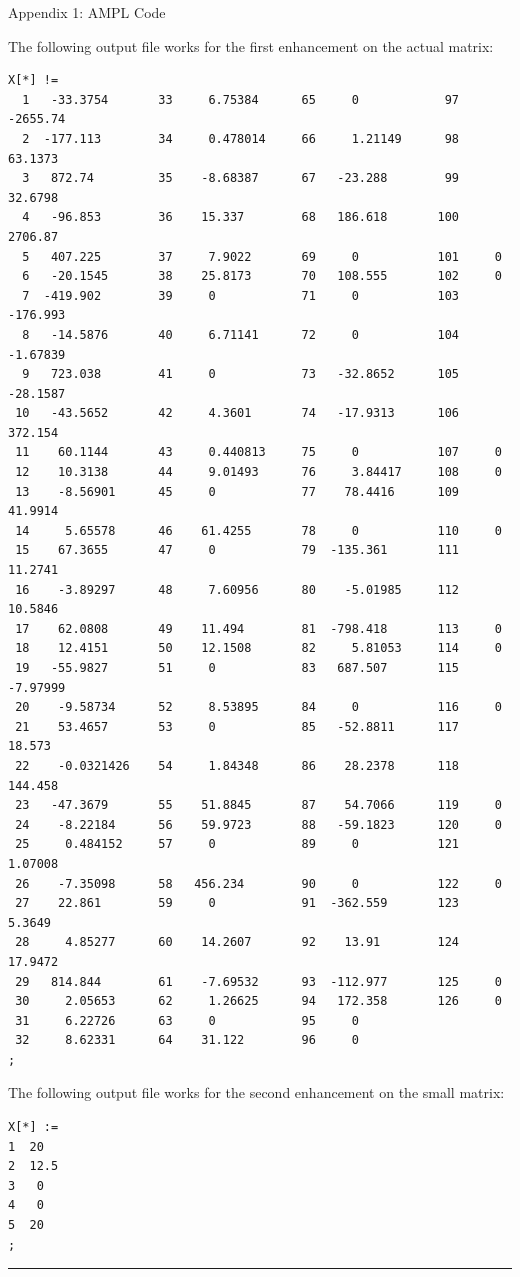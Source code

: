 \documentclass[12pt]{article}
\makeatletter
\newenvironment{task}{\@startsection
       {section}{1}
       {0.4em}{-.5ex plus -1ex minus -.2ex}{.5ex plus .2ex}
       {\pagebreak[3]\large\bf\noindent{Task}}}
       {\nopagebreak[3]\vspace{3ex}\begin{center}\rule{1\linewidth}{.3pt}\end{center}}
\makeatother
\begin{document}
\begin{task}{Appendix 1: AMPL Code}
\begin{enumerate}
The following output file works for the first enhancement on the actual matrix:
\begin{lstlisting}
X[*] !=
  1   -33.3754       33     6.75384      65     0            97 -2655.74
  2  -177.113        34     0.478014     66     1.21149      98    63.1373
  3   872.74         35    -8.68387      67   -23.288        99    32.6798
  4   -96.853        36    15.337        68   186.618       100  2706.87
  5   407.225        37     7.9022       69     0           101     0
  6   -20.1545       38    25.8173       70   108.555       102     0
  7  -419.902        39     0            71     0           103  -176.993
  8   -14.5876       40     6.71141      72     0           104    -1.67839
  9   723.038        41     0            73   -32.8652      105   -28.1587
 10   -43.5652       42     4.3601       74   -17.9313      106   372.154
 11    60.1144       43     0.440813     75     0           107     0
 12    10.3138       44     9.01493      76     3.84417     108     0
 13    -8.56901      45     0            77    78.4416      109    41.9914
 14     5.65578      46    61.4255       78     0           110     0
 15    67.3655       47     0            79  -135.361       111    11.2741
 16    -3.89297      48     7.60956      80    -5.01985     112    10.5846
 17    62.0808       49    11.494        81  -798.418       113     0
 18    12.4151       50    12.1508       82     5.81053     114     0
 19   -55.9827       51     0            83   687.507       115    -7.97999
 20    -9.58734      52     8.53895      84     0           116     0
 21    53.4657       53     0            85   -52.8811      117    18.573
 22    -0.0321426    54     1.84348      86    28.2378      118   144.458
 23   -47.3679       55    51.8845       87    54.7066      119     0
 24    -8.22184      56    59.9723       88   -59.1823      120     0
 25     0.484152     57     0            89     0           121     1.07008
 26    -7.35098      58   456.234        90     0           122     0
 27    22.861        59     0            91  -362.559       123     5.3649
 28     4.85277      60    14.2607       92    13.91        124    17.9472
 29   814.844        61    -7.69532      93  -112.977       125     0
 30     2.05653      62     1.26625      94   172.358       126     0
 31     6.22726      63     0            95     0
 32     8.62331      64    31.122        96     0
;
\end{lstlisting}

The following output file works for the second enhancement on the small matrix:
\begin{lstlisting}
X[*] :=
1  20
2  12.5
3   0
4   0
5  20
;
\end{lstlisting}


\end{enumerate}
\end{task}
\end{document}
